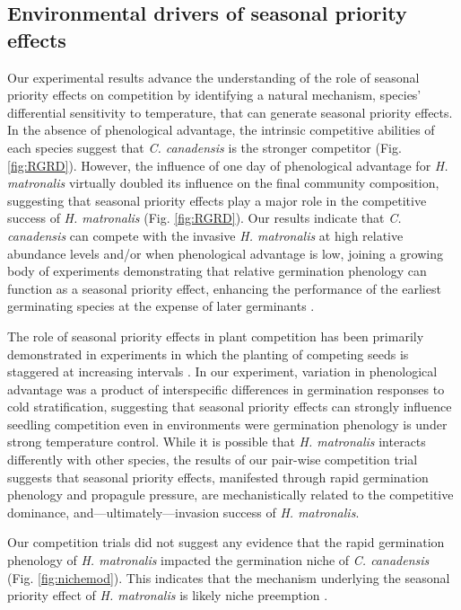 \documentclass{article}[11pt]
\begin{document}
\subsection*{Environmental drivers of seasonal priority effects}
Our experimental results advance the understanding of the role of seasonal priority effects on competition by identifying a natural mechanism, species' differential sensitivity to temperature, that can generate seasonal priority effects. In the absence of phenological advantage, the intrinsic competitive abilities of each species suggest that \textit{C. canadensis} is the stronger competitor (Fig. \ref{fig:RGRD}). %
However, the influence of one day of phenological advantage for \textit{H. matronalis} virtually doubled its influence on the final community composition, suggesting that seasonal priority effects play a major role in the competitive success of \textit{H. matronalis} (Fig. \ref{fig:RGRD}). Our results indicate that \textit{C. canadensis} can compete with the invasive \textit{H. matronalis} at high relative abundance levels and/or when phenological advantage is low, joining a growing body of experiments demonstrating that relative germination phenology can function as a seasonal priority effect, enhancing the performance of the earliest germinating species at the expense of later germinants \citep{Korner2008,Dickson2012,Ross1972}.

The role of seasonal priority effects in plant competition has been primarily demonstrated in experiments in which the planting of competing seeds is staggered at increasing intervals \citep{Young:2017aa,Weidlich:2020aa}. In our experiment, variation in phenological advantage was a product of interspecific differences in germination responses to cold stratification, suggesting that seasonal priority effects can strongly influence seedling competition even in environments were germination phenology is under strong temperature control. While it is possible that \textit{H. matronalis} interacts differently with other species, the results of our pair-wise competition trial suggests that seasonal priority effects, manifested through rapid germination phenology and propagule pressure, are mechanistically related to the competitive dominance, and---ultimately---invasion success of \textit{H. matronalis}. 

Our competition trials did not suggest any evidence that the rapid germination phenology of \textit{H. matronalis} impacted the germination niche of \textit{C. canadensis} (Fig. \ref{fig:nichemod}). This indicates that the mechanism underlying the seasonal priority effect of \textit{H. matronalis} is likely niche preemption \citep{Gioria2018}.%
\end{document}
